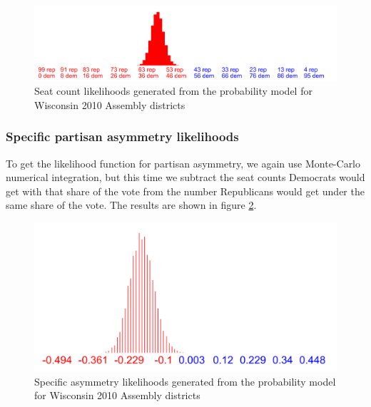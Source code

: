 \documentclass[preprint,12pt]{article}
\begin{document}
\begin{figure}[htb!]
    \begin{center}
        \includegraphics[scale=0.3]{../Figures/WI2010/seats_cropped.png}
        \caption{Seat count likelihoods generated from the probability model for Wisconsin 2010 Assembly districts}\label{fig:LikelihoodsSeatCounts}
    \end{center}
\end{figure}
 

\subsubsection{Specific partisan asymmetry likelihoods}
 
To get the likelihood function for partisan asymmetry, we again use Monte-Carlo numerical integration, but this time we subtract the seat counts Democrats would get with that share of the vote from the number Republicans would get under the same share of the vote. The results are shown in figure \ref{fig:LikelihoodsAsymmetry}.
 
\begin{figure}[htb!]
    \begin{center}
        \includegraphics[scale=0.5]{../Figures/WI2010/asymmetry_alt.png}
        \caption{Specific asymmetry likelihoods generated from the probability model for Wisconsin 2010 Assembly districts}\label{fig:LikelihoodsAsymmetry}
    \end{center}
\end{figure}
 
\end{document}

